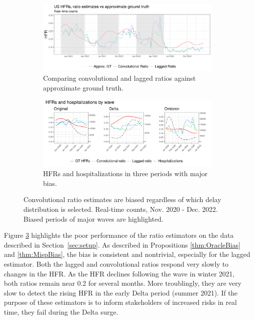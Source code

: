 \documentclass{article}
\newcommand{\djmcomment}[1]{{\color{teal}[DJM: #1]}}
\begin{document}
\begin{figure}
     \centering
     \begin{subfigure}[b]{0.75\linewidth} %
         \centering
         \includegraphics[width=\linewidth]{Figures/Real/US_ests_realtime.pdf}
         \caption{Comparing convolutional and lagged ratios against approximate ground truth.}
         \vspace{10pt}
         \label{fig:basic_est_vs_gt}
     \end{subfigure}
     \begin{subfigure}[b]{0.9\linewidth}%
         \centering
         \includegraphics[width=\linewidth]{Figures/Real/hfrs_by_wave.pdf}
         \caption{HFRs and hospitalizations in three periods with major bias.} 
         \label{fig:wave}
     \end{subfigure}
        \caption{Convolutional ratio estimates are biased regardless of which delay distribution is selected. Real-time counts, Nov. 2020 - Dec. 2022. Biased periods of major waves are highlighted.}
        \label{fig:basic_est_vs_gt_figs}
\end{figure}

Figure \ref{fig:basic_est_vs_gt_figs} highlights the poor performance of the ratio estimators on the data described in Section~\ref{sec:setup}. 
As described in Propositions \ref{thm:OracleBias} and \ref{thm:MispBias}, the bias is consistent and nontrivial, especially for the lagged estimator.
Both the lagged and convolutional ratios respond very slowly to
changes in the HFR. As the HFR declines following the wave in winter 2021, both
ratios remain near 0.2 for several months. More troublingly, they are very slow
to detect the rising HFR in the early Delta period (summer 2021). %
If the purpose of these estimators is to inform stakeholders of increased risks
in real time, they fail during the Delta surge.
\end{document}
